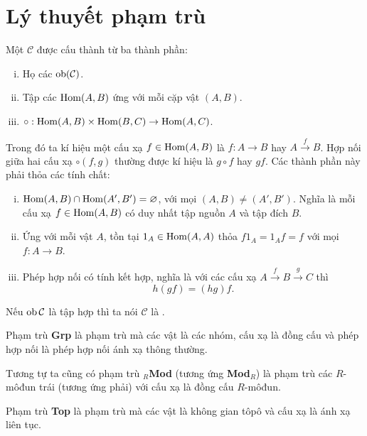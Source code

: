 
\section{Lý thuyết phạm trù}
\begin{define}
    Một  $\mathcal{C}$ được cấu thành từ ba thành phần:
    \begin{enumerate}[(i)]
        \item Họ các  $\operatorname{ob}(\mathcal{C})$.
        \item Tập các  $\operatorname{Hom}(A,B)$ ứng với mỗi cặp vật $(A,B)$.
        \item {} $\circ: \operatorname{Hom}(A,B) \times \operatorname{Hom}(B,C) \rightarrow \operatorname{Hom}(A,C)$.
    \end{enumerate}
    Trong đó ta kí hiệu một cấu xạ $f \in \operatorname{Hom}(A,B)$ là $f: A \rightarrow B$ hay $A \xrightarrow{f} B$. Hợp nối giữa hai cấu xạ $\circ(f,g)$ thường được kí hiệu là $g \circ f$ hay $gf$. Các thành phần này phải thỏa các tính chất:
    \begin{enumerate}[(i)]
        \item $\operatorname{Hom}(A,B) \cap \operatorname{Hom}(A',B') = \varnothing$, với mọi $(A,B) \neq (A',B')$. Nghĩa là mỗi cấu xạ $f \in \operatorname{Hom}(A,B)$ có duy nhất tập nguồn $A$ và tập đích $B$.
        \item Ứng với mỗi vật $A$, tồn tại  $1_A \in \operatorname{Hom}(A,A)$ thỏa $f 1_A = 1_A f = f$ với mọi $f: A \rightarrow B$.
        \item Phép hợp nối có tính kết hợp, nghĩa là với các cấu xạ $A \xrightarrow{f} B \xrightarrow{g} C$ thì
              $$
                  h(gf) = (hg)f.
              $$
    \end{enumerate}
    Nếu $\operatorname{ob}{\mathcal{C}}$ là tập hợp thì ta nói $\mathcal{C}$ là .
\end{define}

\begin{example}
    Phạm trù \textbf{Grp} là phạm trù mà các vật là các nhóm, cấu xạ là đồng cấu và phép hợp nối là phép hợp nối ánh xạ thông thường.

    Tương tự ta cũng có phạm trù $_R$\textbf{Mod} (tương ứng \textbf{Mod}$_R$) là phạm trù các $R$-môđun trái (tương ứng phải) với cấu xạ là đồng cấu $R$-môđun.

    Phạm trù \textbf{Top} là phạm trù mà các vật là không gian tôpô và cấu xạ là ánh xạ liên tục.
\end{example}

